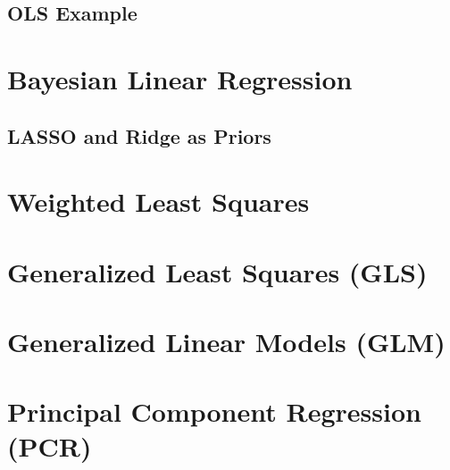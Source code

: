 \subsection{OLS Example}
\label{regression:linear:example}

\section{Bayesian Linear Regression}
\label{regression:bayesian_linear}

\subsection{LASSO and Ridge as Priors}
\label{regression:bayesian_linear:lasso_vs_ridge}

\section{Weighted Least Squares}
\label{regression:WLS}

\section{Generalized Least Squares (GLS)}
\label{regression:GLS}

\section{Generalized Linear Models (GLM)}
\label{regression:GLM}

\section{Principal Component Regression (PCR)}
\label{regression:PCR}

